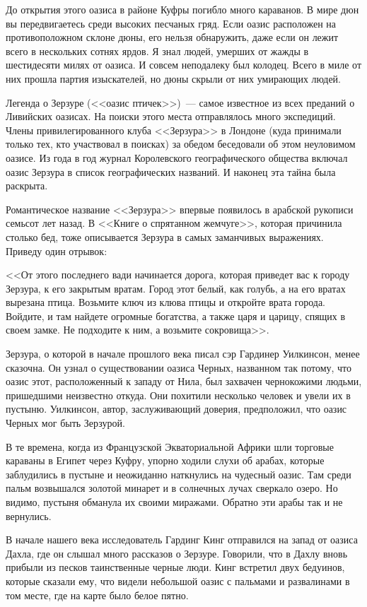 \documentclass[12pt,a4paper,twoside,openany,svgnames]{memoir}
\begin{document}
До открытия этого оазиса в районе Куфры погибло много караванов. В мире дюн вы передвигаетесь среди высоких песчаных гряд. Если оазис расположен на противоположном склоне дюны, его нельзя обнаружить, даже если он лежит всего в нескольких сотнях ярдов. Я знал людей, умерших от жажды в шестидесяти милях от оазиса. И совсем неподалеку был колодец. Всего в миле от них прошла партия изыскателей, но дюны скрыли от них умирающих людей.

Легенда о Зерзуре (<<оазис птичек>>)~--- самое известное из всех преданий о Ливийских оазисах. На поиски этого места отправлялось много экспедиций. Члены привилегированного клуба <<Зерзура>> в Лондоне (куда принимали только тех, кто участвовал в поисках) за обедом беседовали об этом неуловимом оазисе. Из года в год журнал Королевского географического общества включал оазис Зерзура в список географических названий. И наконец эта тайна была раскрыта.

Романтическое название <<Зерзура>> впервые появилось в арабской рукописи семьсот лет назад. В <<Книге о спрятанном жемчуге>>, которая причинила столько бед, тоже описывается Зерзура в самых заманчивых выражениях. Приведу один отрывок:

<<От этого последнего вади начинается дорога, которая приведет вас к городу Зерзура, к его закрытым вратам. Город этот белый, как голубь, а на его вратах вырезана птица. Возьмите ключ из клюва птицы и откройте врата города. Войдите, и там найдете огромные богатства, а также царя и царицу, спящих в своем замке. Не подходите к ним, а возьмите сокровища>>.

Зерзура, о которой в начале прошлого века писал сэр Гардинер Уилкинсон, менее сказочна. Он узнал о существовании оазиса Черных, названном так потому, что оазис этот, расположенный к западу от Нила, был захвачен чернокожими людьми, пришедшими неизвестно откуда. Они похитили несколько человек и увели их в пустыню. Уилкинсон, автор, заслуживающий доверия, предположил, что оазис Черных мог быть Зерзурой.

В те времена, когда из Французской Экваториальной Африки шли торговые караваны в Египет через Куфру, упорно ходили слухи об арабах, которые заблудились в пустыне и неожиданно наткнулись на чудесный оазис. Там среди пальм возвышался золотой минарет и в солнечных лучах сверкало озеро. Но видимо, пустыня обманула их своими миражами. Обратно эти арабы так и не вернулись.

В начале нашего века исследователь Гардинг Кинг отправился на запад от оазиса Дахла, где он слышал много рассказов о Зерзуре. Говорили, что в Дахлу вновь прибыли из песков таинственные черные люди. Кинг встретил двух бедуинов, которые сказали ему, что видели небольшой оазис с пальмами и развалинами в том месте, где на карте было белое пятно.
\end{document}
